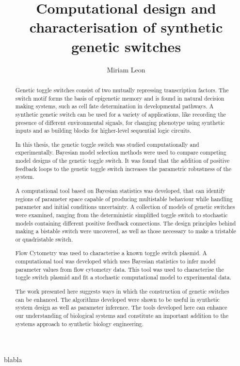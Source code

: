 \documentclass[]{phdthesis}
\title{Computational design and\\[0.2em]characterisation of synthetic\\[0.2em] genetic switches}
\author{Miriam Leon}
\begin{document}
\maketitle


\begin{abstract}
Genetic toggle switches consist of two mutually repressing transcription factors. The switch motif forms the basis of epigenetic memory and is found in natural decision making systems, such as cell fate determination in developmental pathways. A synthetic genetic switch can be used for a variety of applications, like recording the presence of different environmental signals, for changing phenotype using synthetic inputs and as building blocks for higher-level sequential logic circuits. 

In this thesis, the genetic toggle switch was studied computationally and experimentally. Bayesian model selection methods were used to compare competing model designs of the genetic toggle switch. It was found that the addition of positive feedback loops to the genetic toggle switch increases the parametric robustness of the system.

A computational tool based on Bayesian statistics was developed, that can identify regions of parameter space capable of producing multistable behaviour while handling parameter and initial conditions uncertainty. A collection of models of genetic switches were examined, ranging from the deterministic simplified toggle switch to stochastic models containing different positive feedback connections. The design principles behind making a bistable switch were uncovered, as well as those necessary to make a tristable or quadristable switch.

Flow Cytometry was used to characterise a known toggle switch plasmid. A computational tool was developed which uses Bayesian statistics to infer model parameter values from flow cytometry data. This tool was used to characterise the toggle switch plasmid and fit a stochastic computational model to experimental data.

The work presented here suggests ways in which the construction of genetic switches can be enhanced. The algorithms developed were shown to be useful in synthetic system design as well as parameter inference. The tools developed here can enhance our understanding of biological systems and constitute an important addition to the systems approach to synthetic biology engineering. 


\end{abstract}
\begin{acknowledgements}
blabla
\end{acknowledgements}
\tableofcontents*
\listoffigures
\listoftables
{}
\end{document}
